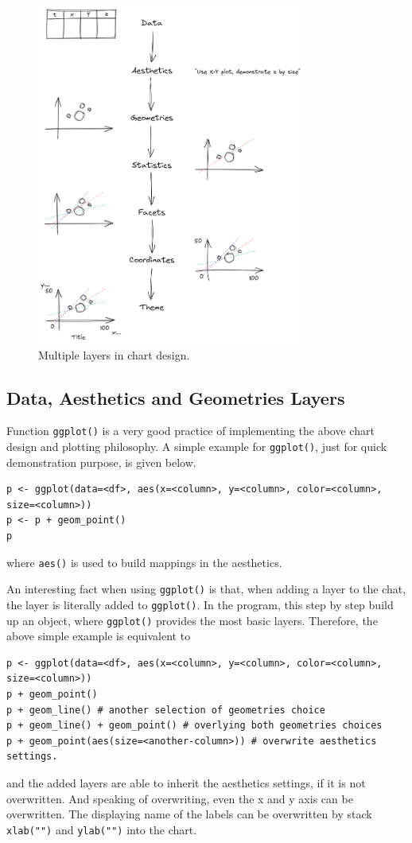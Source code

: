 \begin{figure}
	\centering
	\includegraphics[width=250pt]{chapters/ch-r/figures/chart_layer.png}
	\caption{Multiple layers in chart design.} \label{ch:r1:fig:chart_layer}
\end{figure}

\subsection{Data, Aesthetics and Geometries Layers}

Function \verb|ggplot()| is a very good practice of implementing the above chart design and plotting philosophy. A simple example for \verb|ggplot()|, just for quick demonstration purpose, is given below.
\begin{lstlisting}
p <- ggplot(data=<df>, aes(x=<column>, y=<column>, color=<column>, size=<column>))
p <- p + geom_point()
p
\end{lstlisting}
where \verb|aes()| is used to build mappings in the aesthetics.

An interesting fact when using \verb|ggplot()| is that, when adding a layer to the chat, the layer is literally added to \verb|ggplot()|. In the program, this step by step build up an object, where \verb|ggplot()| provides the most basic layers. Therefore, the above simple example is equivalent to
\begin{lstlisting}
p <- ggplot(data=<df>, aes(x=<column>, y=<column>, color=<column>, size=<column>))
p + geom_point()
p + geom_line() # another selection of geometries choice
p + geom_line() + geom_point() # overlying both geometries choices
p + geom_point(aes(size=<another-column>)) # overwrite aesthetics settings.
\end{lstlisting}
and the added layers are able to inherit the aesthetics settings, if it is not overwritten. And speaking of overwriting, even the x and y axis can be overwritten. The displaying name of the labels can be overwritten by stack \verb|xlab("")| and \verb|ylab("")| into the chart.

